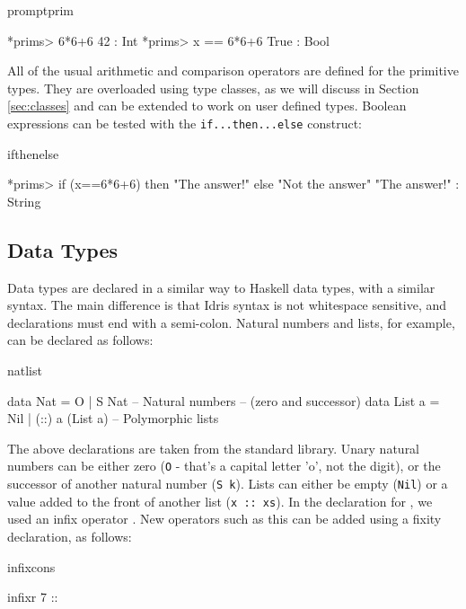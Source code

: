 \begin{SaveVerbatim}{promptprim}

*prims> 6*6+6
42 : Int
*prims> x == 6*6+6
True : Bool

\end{SaveVerbatim}

\noindent
All of the usual arithmetic and comparison operators are defined for the primitive
types. They are overloaded using type classes, as we will discuss in Section
\ref{sec:classes} and can be extended to work on user defined types.
Boolean expressions can be tested with the \texttt{if...then...else} construct:

\begin{SaveVerbatim}{ifthenelse}

*prims> if (x==6*6+6) then "The answer!" else "Not the answer"
"The answer!" : String

\end{SaveVerbatim}

\subsection{Data Types}

Data types are declared in a similar way to Haskell data types, with a similar
syntax. The main difference is that Idris syntax is not whitespace sensitive,
and declarations must end with a semi-colon. Natural numbers and lists, for 
example, can be declared as follows:

\begin{SaveVerbatim}{natlist}

data Nat    = O   | S Nat           -- Natural numbers
                                    -- (zero and successor)
data List a = Nil | (::) a (List a) -- Polymorphic lists

\end{SaveVerbatim}

\noindent
The above declarations are taken from the standard library. Unary natural
numbers can be either zero (\texttt{O} - that's a capital letter 'o', not the digit), or
the successor of another natural number (\texttt{S k}). 
Lists can either be empty (\texttt{Nil})
or a value added to the front of another list (\texttt{x :: xs}).
In the declaration for , we used an infix operator \tDC{::}. New operators
such as this can be added using a fixity declaration, as follows:

\begin{SaveVerbatim}{infixcons}

infixr 7 :: 

\end{SaveVerbatim}

